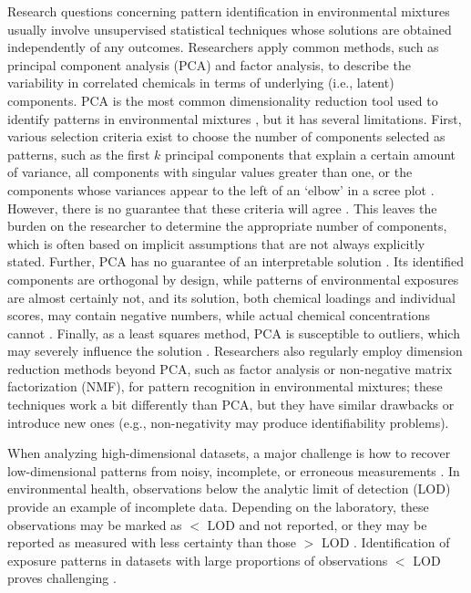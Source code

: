 Research questions concerning pattern identification in environmental mixtures usually involve unsupervised statistical techniques whose solutions are obtained independently of any outcomes. Researchers apply common methods, such as principal component analysis (PCA) and factor analysis, to describe the variability in correlated chemicals in terms of underlying (i.e., latent) components. PCA is the most common dimensionality reduction tool used to identify patterns in environmental mixtures \citep{pang16, mak14_unc, gibsonnunez, robinson2018urban, manzano2015tnf}, but it has several limitations. First, various selection criteria exist to choose the number of components selected as patterns, such as the first $k$ principal components that explain a certain amount of variance, all components with singular values greater than one, or the components whose variances appear to the left of an `elbow' in a scree plot \citep{jolliffe1986principal}.  However, there is no guarantee that these criteria will agree \citep{jolliffe2016principal}. This leaves the burden on the researcher to determine the appropriate number of components, which is often based on implicit assumptions that are not always explicitly stated. Further, PCA has no guarantee of an interpretable solution \citep{lever2017points}. Its identified components are orthogonal by design, while patterns of environmental exposures are almost certainly not, and its solution, both chemical loadings and individual scores, may contain negative numbers, while actual chemical concentrations cannot \citep{friedman2001elements}. Finally, as a least squares method, PCA is susceptible to outliers, which may severely influence the solution \citep{wold1987principal}. Researchers also regularly employ dimension reduction methods beyond PCA, such as factor analysis or non-negative matrix factorization (NMF), for pattern recognition in environmental mixtures; these techniques work a bit differently than PCA, but they have similar drawbacks or introduce new ones (e.g., non-negativity may produce identifiability problems).

When analyzing high-dimensional datasets, a major challenge is how to recover low-dimensional patterns from noisy, incomplete, or erroneous measurements \citep{gull1978image}. In environmental health, observations below the analytic limit of detection (LOD) provide an example of incomplete data. Depending on the laboratory, these observations may be marked as $<$ LOD and not reported, or they may be reported as measured with less certainty than those $>$ LOD \citep{helsel2005more, helsel2005nondetects}. Identification of exposure patterns in datasets with large proportions of observations $<$ LOD proves challenging \citep{epalod}. 


